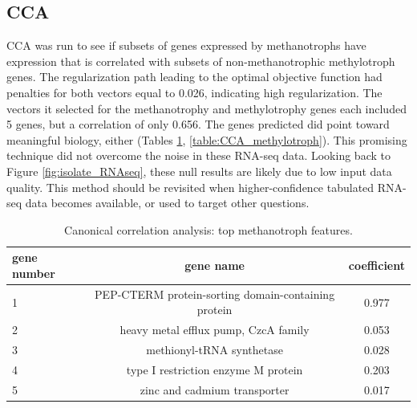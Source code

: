 

\subsection{CCA}

CCA was run to see if subsets of genes expressed by methanotrophs have expression that is correlated with subsets of non-methanotrophic methylotroph genes.
The regularization path leading to the optimal objective function had penalties for both vectors equal to 0.026, indicating high regularization.
The vectors it selected for the methanotrophy and methylotrophy genes each included 5 genes, but a correlation of only 0.656.
The genes predicted did point toward meaningful biology, either (Tables \ref{table:CCA_methanotroph}, \ref{table:CCA_methylotroph}).
This promising technique did not overcome the noise in these RNA-seq data.
Looking back to Figure \ref{fig:isolate_RNAseq}, these null results are likely due to low input data quality.
This method should be revisited when higher-confidence tabulated RNA-seq data becomes available, or used to target other questions.

\begin{table}[H]
\centering
\begin{singlespace}
\caption[Canonical correlation analysis: top features]{Canonical correlation analysis: top methanotroph features.}
\begin{tabular}{l | c | c}
          gene number & gene name & coefficient  \\
\midrule
	1 & PEP-CTERM protein-sorting domain-containing  protein & 0.977  \\
	2 & heavy metal efflux pump, CzcA family &  0.053  \\
	3 & methionyl-tRNA synthetase &  0.028 \\
	4 & type I restriction enzyme M protein &  0.203 \\
	5 & zinc and cadmium transporter &  0.017 \\
\end{tabular}
\label{table:CCA_methanotroph}
\end{singlespace}
\end{table}

